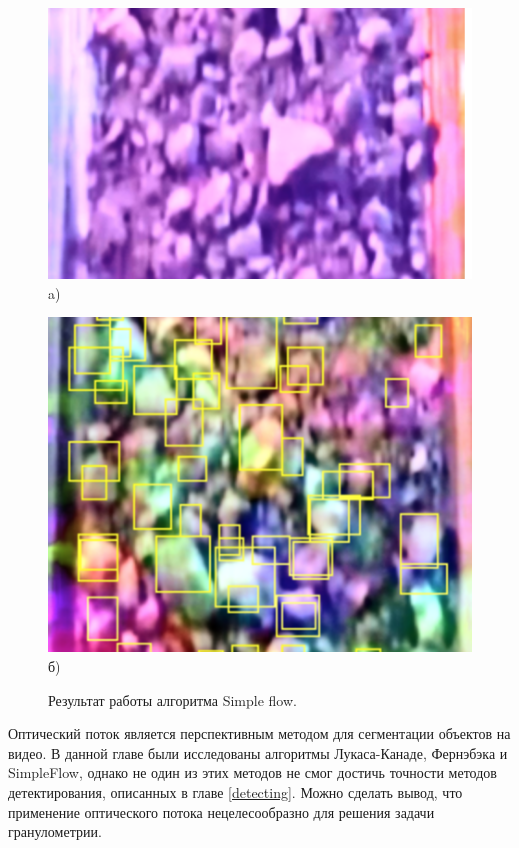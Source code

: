 \documentclass[times]{itmo-student-thesis}
\begin{document}
\begin{figure}[h]
	\begin{minipage}[h]{0.49\linewidth}
		\centering
		\includegraphics[width=0.9\linewidth]{images/pink} \\ a)
	\end{minipage}
	\hfill
	\begin{minipage}[h]{0.49\linewidth}
		\centering
		\includegraphics[width=0.9\linewidth]{images/sf} \\ б)
	\end{minipage}
	\caption{Результат работы алгоритма Simple flow. }
	\label{fig:sf}
\end{figure}


 \chapterconclusion
Оптический поток является перспективным методом для сегментации объектов на видео. В данной главе были исследованы алгоритмы Лукаса-Канаде, Фернэбэка и SimpleFlow, однако не один из этих методов не смог достичь точности методов детектирования, описанных в главе \ref{detecting}. Можно сделать вывод, что применение оптического потока нецелесообразно для решения задачи гранулометрии.
\end{document}
